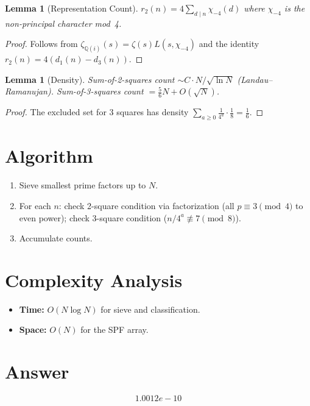 \documentclass[11pt]{article}
\newtheorem{lemma}[theorem]{Lemma}
\begin{document}
\begin{lemma}[Representation Count]
$r_2(n) = 4\sum_{d\mid n}\chi_{-4}(d)$ where $\chi_{-4}$ is the non-principal character mod~4.
\end{lemma}

\begin{proof}
Follows from $\zeta_{\mathbb{Q}(i)}(s) = \zeta(s)L(s,\chi_{-4})$ and the identity $r_2(n) = 4(d_1(n)-d_3(n))$.
\end{proof}

\begin{lemma}[Density]
Sum-of-2-squares count $\sim C\cdot N/\sqrt{\ln N}$ (Landau--Ramanujan). Sum-of-3-squares count $= \frac{5}{6}N + O(\sqrt{N})$.
\end{lemma}

\begin{proof}
The excluded set for 3 squares has density $\sum_{a\ge 0}\frac{1}{4^a}\cdot\frac{1}{8} = \frac{1}{6}$.
\end{proof}

\section{Algorithm}

\begin{enumerate}
\item Sieve smallest prime factors up to $N$.
\item For each $n$: check 2-square condition via factorization (all $p\equiv 3\pmod 4$ to even power); check 3-square condition ($n/4^a \not\equiv 7\pmod 8$).
\item Accumulate counts.
\end{enumerate}

\section{Complexity Analysis}

\begin{itemize}
\item \textbf{Time:} $O(N\log N)$ for sieve and classification.
\item \textbf{Space:} $O(N)$ for the SPF array.
\end{itemize}

\section{Answer}

\[
\boxed{1.0012e-10}
\]
\end{document}
